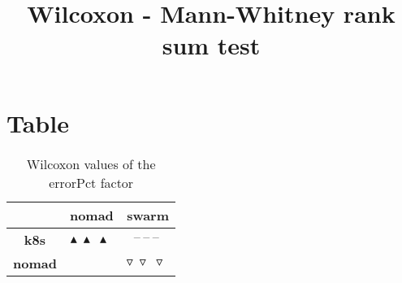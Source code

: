 \documentclass{article}
\title{Wilcoxon - Mann-Whitney rank sum test}
\author{}
\begin{document}
\maketitle
\section{Table}
\begin{table}[!htp]
  \caption{Wilcoxon values of the errorPct factor}
  \label{table:errorPct}
  \centering
  \begin{scriptsize}
  \begin{tabular}{c|cc}
      & \textbf{nomad} & \textbf{swarm} \\\hline
      \textbf{k8s} & $\blacktriangle\ \blacktriangle\ \blacktriangle\  $ & $ \text{--}\ \text{--}\ \text{--}\ $ \\
      \textbf{nomad} & $ $ & $ \triangledown\ \triangledown\ \triangledown\ $ \\
  \end{tabular}
  \end{scriptsize}
\end{table}
\end{document}
